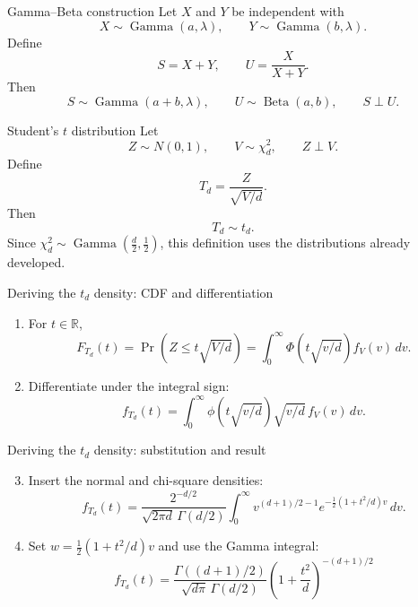 \documentclass[aspectratio=169,11pt]{beamer}
\newcommand{\GammaDist}{\operatorname{Gamma}}
\begin{document}
\begin{frame}{Gamma--Beta construction}
  Let $X$ and $Y$ be independent with
  \[
    X\sim\GammaDist(a,\lambda),
    \qquad
    Y\sim\GammaDist(b,\lambda).
  \]
  Define
  \[
    S=X+Y,
    \qquad
    U=\frac{X}{X+Y}.
  \]
  Then
  \[
    \boxed{S\sim\GammaDist(a+b,\lambda),
    \qquad U\sim\operatorname{Beta}(a,b),
    \qquad S\perp U.}
  \]
\end{frame}

\begin{frame}{Student's $t$ distribution}
  Let
  \[
    Z\sim N(0,1),\qquad V\sim\chi^2_d,
    \qquad Z\perp V.
  \]
  Define
  \[
    T_d=\frac{Z}{\sqrt{V/d}}.
  \]
  Then
  \[
    \boxed{T_d\sim t_d.}
  \]
  Since $\chi^2_d\sim\GammaDist\!\left(\frac d2,\frac12\right)$, this definition uses the distributions already developed.
\end{frame}

\begin{frame}{Deriving the $t_d$ density: CDF and differentiation}
  \small
  \begin{enumerate}
    \item For $t\in\mathbb R$,
      \[
        F_{T_d}(t)
        =\Pr\!\left(Z\le t\sqrt{V/d}\right)
        =\int_0^\infty \Phi\!\left(t\sqrt{v/d}\right)f_V(v)\,dv.
      \]
    \item Differentiate under the integral sign:
      \[
        f_{T_d}(t)
        =\int_0^\infty
          \phi\!\left(t\sqrt{v/d}\right)\sqrt{v/d}\,f_V(v)\,dv.
      \]
  \end{enumerate}
\end{frame}

\begin{frame}{Deriving the $t_d$ density: substitution and result}
  \small
  \begin{enumerate}
    \setcounter{enumi}{2}
    \item Insert the normal and chi-square densities:
      \[
        f_{T_d}(t)
        =\frac{2^{-d/2}}{\sqrt{2\pi d}\,\Gamma(d/2)}
        \int_0^\infty v^{(d+1)/2-1}
        e^{-\frac12(1+t^2/d)v}\,dv.
      \]
    \item Set $w=\frac12(1+t^2/d)v$ and use the Gamma integral:
      \[
        \boxed{
        f_{T_d}(t)=
        \frac{\Gamma((d+1)/2)}{\sqrt{d\pi}\,\Gamma(d/2)}
        \left(1+\frac{t^2}{d}\right)^{-(d+1)/2}}
      \]
  \end{enumerate}
\end{frame}
\end{document}
